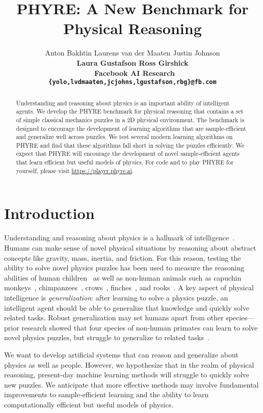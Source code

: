 \documentclass{article}
\title{PHYRE: A New Benchmark for Physical Reasoning}
\author{Anton Bakhtin \quad\quad
  Laurens van der Maaten \quad\quad
  Justin Johnson \\
  \bf{Laura Gustafson} \quad\quad
  \bf{Ross Girshick} \\\
  Facebook AI Research \\
  \texttt{\{yolo,lvdmaaten,jcjohns,lgustafson,rbg\}@fb.com} \\
}
\begin{document}
\maketitle

\vspace{-1em}
\begin{abstract}
Understanding and reasoning about physics is an important ability of intelligent agents. We develop the PHYRE benchmark for physical reasoning that contains a set of simple classical mechanics puzzles in a 2D physical environment. The benchmark is designed to encourage the development of learning algorithms that are sample-efficient and generalize well across puzzles. We test several modern learning algorithms on PHYRE and find that these algorithms fall short in solving the puzzles efficiently. We expect that PHYRE will encourage the development of novel sample-efficient agents that learn efficient but useful models of physics. For code and to play PHYRE for yourself, please visit \url{https://player.phyre.ai}.
\end{abstract}



\section{Introduction}
\label{sec:introduction}

Understanding and reasoning about physics is a hallmark of intelligence~\cite{davis2006}.
Humans can make sense of novel physical situations by reasoning about abstract concepts like gravity, mass, inertia, and friction.
For this reason, testing the ability to solve novel physics puzzles has been used to measure the reasoning abilities of human children~\cite{cheke2012children,visalberghi1996acting} as well as non-human animals such as capuchin monkeys~\cite{visalberghi1994lack,visalberghi1989tool}, chimpanzees~\cite{povinelli2000folk}, crows~\cite{jelbert2014using,taylor2008new}, finches~\cite{teschke2011physical}, and rooks~\cite{bird2009rooks}. A key aspect of physical intelligence is \emph{generalization}: after learning to solve a physics puzzle, an intelligent agent should be able to generalize that knowledge and quickly solve related tasks. Robust generalization may set humans apart from other species---prior research showed that four species of non-human primates can learn to solve novel physics puzzles, but struggle to generalize to related tasks~\cite{martin2008tubes}.

We want to develop artificial systems that can reason and generalize about physics as well as people. However, we hypothesize that in the realm of physical reasoning, present-day machine learning methods will struggle to quickly solve new puzzles.  We anticipate that more effective methods may involve fundamental improvements to sample-efficient learning and the ability to learn computationally efficient but useful models of physics.
\end{document}
